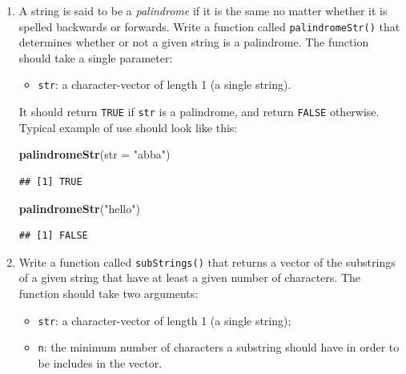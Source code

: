 \documentclass[]{book}
\makeatletter
\newenvironment{Shaded}{\begin{snugshade}}{\end{snugshade}}
\newcommand{\KeywordTok}[1]{\textcolor[rgb]{0.13,0.29,0.53}{\textbf{{#1}}}}
\newcommand{\DataTypeTok}[1]{\textcolor[rgb]{0.13,0.29,0.53}{{#1}}}
\newcommand{\StringTok}[1]{\textcolor[rgb]{0.31,0.60,0.02}{{#1}}}
\newcommand{\NormalTok}[1]{{#1}}
\providecommand{\tightlist}{%
  \setlength{\itemsep}{0pt}\setlength{\parskip}{0pt}}
\newenvironment{kframe}{%
\medskip{}
\setlength{\fboxsep}{.8em}
 \def\at@end@of@kframe{}%
 \ifinner\ifhmode%
  \def\at@end@of@kframe{\end{minipage}}%
  \begin{minipage}{\columnwidth}%
 \fi\fi%
 \def\FrameCommand##1{\hskip\@totalleftmargin \hskip-\fboxsep
 \colorbox{shadecolor}{##1}\hskip-\fboxsep
     \hskip-\linewidth \hskip-\@totalleftmargin \hskip\columnwidth}%
 \MakeFramed {\advance\hsize-\width
   \@totalleftmargin\z@ \linewidth\hsize
   \@setminipage}}%
 {\par\unskip\endMakeFramed%
 \at@end@of@kframe}
\renewenvironment{Shaded}{\begin{kframe}}{\end{kframe}}
\theoremstyle{definition}
\theoremstyle{definition}
\theoremstyle{remark}
\makeatother
\begin{document}
{\begin{enumerate}
\begin{verbatim}
## [1] "eybdoog"
\end{verbatim}
\item
  A string is said to be a \emph{palindrome} if it is the same no matter
  whether it is spelled backwards or forwards. Write a function called
  \texttt{palindromeStr()} that determines whether or not a given string
  is a palindrome. The function should take a single parameter:

  \begin{itemize}
  \tightlist
  \item
    \texttt{str}: a character-vector of length 1 (a single string).
  \end{itemize}

  It should return \texttt{TRUE} if \texttt{str} is a palindrome, and
  return \texttt{FALSE} otherwise. Typical example of use should look
  like this:

\begin{Shaded}
\begin{Highlighting}[]
\KeywordTok{palindromeStr}\NormalTok{(}\DataTypeTok{str =} \StringTok{"abba"}\NormalTok{)}
\end{Highlighting}
\end{Shaded}

\begin{verbatim}
## [1] TRUE
\end{verbatim}

\begin{Shaded}
\begin{Highlighting}[]
\KeywordTok{palindromeStr}\NormalTok{(}\StringTok{"hello"}\NormalTok{)}
\end{Highlighting}
\end{Shaded}

\begin{verbatim}
## [1] FALSE
\end{verbatim}
\item
  Write a function called \texttt{subStrings()} that returns a vector of
  the substrings of a given string that have at least a given number of
  characters. The function should take two arguments:

  \begin{itemize}
  \tightlist
  \item
    \texttt{str}: a character-vector of length 1 (a single string);
  \item
    \texttt{n}: the minimum number of characters a substring should have
    in order to be includes in the vector.
  \end{itemize}


\end{enumerate}}
\end{document}
